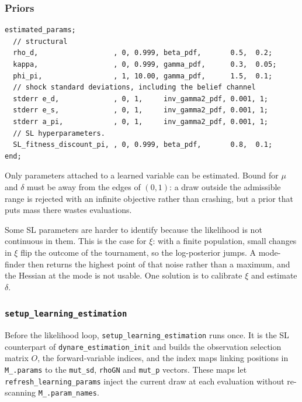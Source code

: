 \documentclass[11pt,a4paper]{article}
\newcommand{\field}[1]{\texttt{#1}}
\begin{document}
\subsubsection{Priors}

\begin{lstlisting}[style=dynare, caption={Priors for SL parameters}]
estimated_params;
  // structural
  rho_d,                  , 0, 0.999, beta_pdf,       0.5,  0.2;
  kappa,                  , 0, 0.999, gamma_pdf,      0.3,  0.05;
  phi_pi,                 , 1, 10.00, gamma_pdf,      1.5,  0.1;
  // shock standard deviations, including the belief channel
  stderr e_d,             , 0, 1,     inv_gamma2_pdf, 0.001, 1;
  stderr e_s,             , 0, 1,     inv_gamma2_pdf, 0.001, 1;
  stderr a_pi,            , 0, 1,     inv_gamma2_pdf, 0.001, 1;
  // SL hyperparameters. 
  SL_fitness_discount_pi, , 0, 0.999, beta_pdf,       0.8,  0.1;
end;
\end{lstlisting}

\noindent
Only parameters attached to a learned variable can be estimated. Bound for $\mu$ and
$\delta$ must be away from the edges of $(0,1)$: a draw outside the admissible range is
rejected with an infinite objective rather than crashing, but a prior that puts
mass there wastes evaluations.

\medskip
\noindent
Some SL parameters are harder to identify because the likelihood is not
continuous in them. This is the case for $\xi$: with a finite population, small
changes in $\xi$ flip the outcome of the tournament, so the log-posterior jumps.
A mode-finder then returns the highest point of that noise rather than a
maximum, and the Hessian at the mode is not usable. One solution is to calibrate
$\xi$ and estimate $\delta$.


\subsubsection{\texttt{setup\_learning\_estimation}}

Before the likelihood loop, \texttt{setup\_learning\_estimation} runs once. It
is the SL counterpart of \texttt{dynare\_estimation\_init} and builds the
observation selection matrix $O$, the forward-variable indices, and the index
maps linking positions in \field{M\_.params} to the \field{mut\_sd},
\field{rhoGN} and \field{mut\_p} vectors. These maps let
\texttt{refresh\_learning\_params} inject the current draw at each evaluation
without re-scanning \field{M\_.param\_names}.


\end{document}
